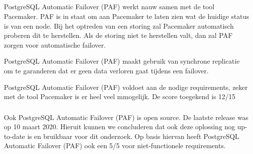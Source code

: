 \subsection{}
\label{subsec:Oplossing 3: PostgreSQL Automatic Failover (PAF)}

\subsubsection{}
\label{subsubsec:Functionele Requirements}

PostgreSQL Automatic Failover (PAF) werkt nauw samen met de tool Pacemaker. PAF is in staat om aan Pacemaker te laten zien wat de huidige status is van een node. Bij het optreden van een storing zal Pacemaker automatisch proberen dit te herstellen.
Als de storing niet te herstellen valt, dan zal PAF zorgen voor automatische failover.

PostgreSQL Automatic Failover (PAF) maakt gebruik van synchrone replicatie om te garanderen dat er geen data verloren gaat tijdens een failover.

PostgreSQL Automatic Failover (PAF) voldoet aan de nodige requirements, zeker met de tool Pacemaker is er heel veel mmogelijk. De score toegekend is 12/15

\subsubsection{}
\label{subsubsec:Niet-functionele Requirements}

Ook PostgreSQL Automatic Failover (PAF) is open source.
De laatste release was op 10 maart 2020. Hieruit kunnen we concluderen dat ook deze oplossing nog up-to-date is en bruikbaar voor dit onderzoek.
Op basis hiervan heeft PostgreSQL Automatic Failover (PAF) ook een 5/5 voor niet-functionele requirements.


\subsection{}
\label{subsec:Oplossing 4: Replication Manager (RepMgr)}

\subsubsection{}
\label{subsubsec:Functionele Requirements}


